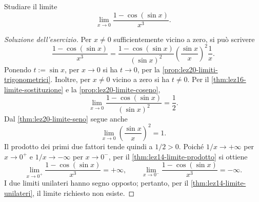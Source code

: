 \begin{exercise}
\label{ex:lez20-coseno-seno-rapporto}
Studiare il limite
\[
  \lim_{x\to0}\frac{1-\cos(\sin x)}{x^3}.
\]
\end{exercise}

\begin{proof}[Soluzione dell'esercizio]
Per \(x\ne0\) sufficientemente vicino a zero,
si può scrivere
\[
  \frac{1-\cos(\sin x)}{x^3}
  =\frac{1-\cos(\sin x)}{(\sin x)^2}
   \left(\frac{\sin x}{x}\right)^2\frac1x.
\]
Ponendo \(t:=\sin x\), per \(x\to0\)
si ha \(t\to0\), per la
\cref{prop:lez20-limiti-trigonometrici}. Inoltre,
per \(x\ne0\) vicino a zero si ha \(t\ne0\).
Per il \cref{thm:lez16-limite-sostituzione}
e la \cref{prop:lez20-limite-coseno},
\[
  \lim_{x\to0}
  \frac{1-\cos(\sin x)}{(\sin x)^2}=\frac12.
\]
Dal \cref{thm:lez20-limite-seno} segue anche
\[
  \lim_{x\to0}\left(\frac{\sin x}{x}\right)^2=1.
\]
Il prodotto dei primi due fattori tende quindi a
\(1/2>0\). Poiché \(1/x\to+\infty\) per
\(x\to0^+\) e \(1/x\to-\infty\) per \(x\to0^-\),
per il \cref{thm:lez14-limite-prodotto} si ottiene
\[
  \lim_{x\to0^+}\frac{1-\cos(\sin x)}{x^3}=+\infty,
  \qquad
  \lim_{x\to0^-}\frac{1-\cos(\sin x)}{x^3}=-\infty.
\]
I due limiti unilateri hanno segno opposto; pertanto,
per il \cref{thm:lez14-limite-unilateri},
il limite richiesto non esiste.
\end{proof}
